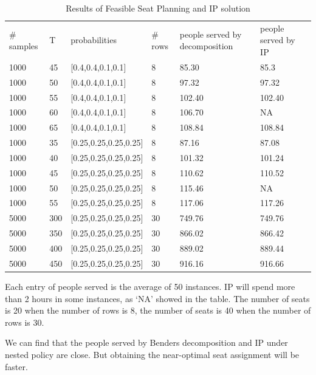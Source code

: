 \begin{table}[ht]
    \caption{Results of Feasible Seat Planning and IP solution}
    \begin{tabular}{|l|l|l|l|l|l|l|}
    \hline
    \# samples & T & probabilities & \# rows & people served by decomposition & people served by IP \\
    1000  & 45  & [0.4,0.4,0.1,0.1] & 8 & 85.30 & 85.3 \\
    1000  & 50  & [0.4,0.4,0.1,0.1] & 8 & 97.32 & 97.32 \\
    1000  & 55  & [0.4,0.4,0.1,0.1] & 8 & 102.40 & 102.40  \\ %
    1000  & 60  & [0.4,0.4,0.1,0.1] & 8 & 106.70 & NA  \\
    1000  & 65  & [0.4,0.4,0.1,0.1] & 8 & 108.84 & 108.84 \\
    \hline
    1000  & 35  & [0.25,0.25,0.25,0.25] & 8 & 87.16 & 87.08 \\
    1000  & 40  & [0.25,0.25,0.25,0.25] & 8 & 101.32 & 101.24 \\
    1000  & 45  & [0.25,0.25,0.25,0.25] & 8 & 110.62 & 110.52 \\
    1000  & 50  & [0.25,0.25,0.25,0.25] & 8 & 115.46 & NA \\
    1000  & 55  & [0.25,0.25,0.25,0.25] & 8 & 117.06 & 117.26 \\
    \hline
    5000  & 300  & [0.25,0.25,0.25,0.25] & 30 & 749.76 & 749.76 \\
    5000  & 350  & [0.25,0.25,0.25,0.25] & 30 & 866.02 & 866.42 \\
    5000  & 400  & [0.25,0.25,0.25,0.25] & 30 & 889.02 & 889.44 \\
    5000  & 450  & [0.25,0.25,0.25,0.25] & 30 & 916.16 & 916.66 \\
    \hline
    \end{tabular}
\end{table}

Each entry of people served is the average of 50 instances.
IP will spend more than 2 hours in some instances, as `NA' showed in the table.
The number of seats is 20 when the number of rows is 8, the number of seats is 40 when the number of rows is 30.

We can find that the people served by Benders decomposition and IP under nested policy are close. But obtaining the near-optimal seat assignment will be faster.


